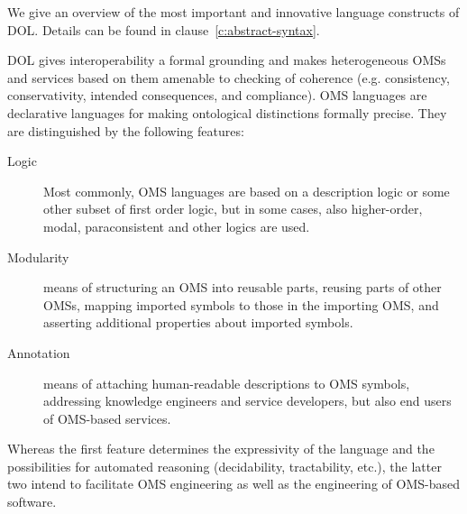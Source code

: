 \documentclass[10pt,%
\ifpretendfinal
final%
\else
draft%
\fi,
]{scrreprt}
\makeatletter
\newcommand*\CommentAuthor{}
\renewcommand*\CommentAuthor{#1}}
\newcommand*\CommentDate{}
\renewcommand*\CommentDate{#1}}
\newcommand*\CommentId{}
\renewcommand*\CommentId{#1}}
\newcommand*\CommentType{}
\renewcommand*\CommentType{#1}}
\newcommand*{\SetCommentColorByType}[1]{%
\edef\localType{{#1}}%
\expandafter\ifstrequal\localType{q-aut}{\colorlet{CommentColor}{red}}{%
\expandafter\ifstrequal\localType{q-all}{\colorlet{CommentColor}{orange}}{%
\expandafter\ifstrequal\localType{todo}{\colorlet{CommentColor}{orange}}{%
\expandafter\ifstrequal\localType{fyi}{\colorlet{CommentColor}{lightgray}}{%
\colorlet{CommentColor}{yellow}}}}}}
\newcommand*{\SetCommentPrefixByType}[1]{%
\edef\localType{{#1}}%
\expandafter\@ifmtarg\localType{%
\edef\CommentPrefix{}%
}{%
\caseupper[q]{#1}%
\edef\CommentPrefix{\thestring: }%
}}
\newcommand*{\initComment}[1]{%
\setkeys{Comment}{#1}%
\SetCommentColorByType{\CommentType}%
\relax%
\SetCommentPrefixByType{\CommentType}%
\relax%
}
\newcommand*{\todonote}[2][]{%
\initComment{#1}%
\pdfcomment[author=\CommentAuthor,color=CommentColor,date=\CommentDate,id=\CommentId]{%
\CommentPrefix
#2}}
\renewcommand*{\todonote}[2][]{%
\initComment{#1}%
\ednote{\CommentPrefix #2}}
\newcommand*{\should}{\textbf{should}\xspace}
\newcommand{\clauserefname}{clause}
\newcommand{\cref}[1]{\clauserefname~\ref{#1}}
\makeatother
\begin{document}
%
%
%
%
%
\label{c:design:overview}
%
We give an overview of the most important and innovative language
constructs of DOL. Details can be found in clause~\ref{c:abstract-syntax}.


DOL gives interoperability a formal grounding and makes heterogeneous OMSs and services based on them amenable to checking of coherence (e.g. consistency, conservativity, intended consequences, and compliance). OMS languages are declarative languages for making ontological distinctions formally precise. They are distinguished by the following features:

\begin{description}
\item[Logic] Most commonly, OMS languages are based on a description logic or some other subset of first order logic, but in some cases, also higher-order, modal, paraconsistent and other logics are used.
\item[Modularity] means of structuring an OMS into reusable parts, reusing parts of other OMSs, mapping imported symbols to those in the importing OMS, and asserting additional properties about imported symbols.
\item[Annotation] means of attaching human-readable descriptions to OMS symbols, addressing knowledge engineers and service developers, but also end users of OMS-based services.
\end{description}
Whereas the first feature determines the expressivity of the language and the possibilities for automated reasoning (decidability, tractability, etc.), the latter two intend to facilitate OMS engineering as well as the engineering of OMS-based software.
\end{document}
